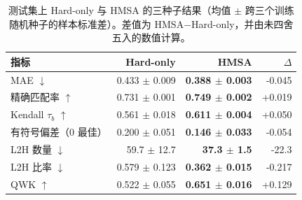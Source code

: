 \begin{table}[H]
\centering
\caption{测试集上 Hard-only 与 HMSA 的三种子结果（均值 $\pm$ 跨三个训练随机种子的样本标准差）。差值为 HMSA$-$Hard-only，并由未四舍五入的数值计算。}
\label{tab:main_results}
\small
\begin{tabular}{lrrr}
\toprule
指标 & Hard-only & HMSA & $\Delta$ \\
\midrule
MAE $\downarrow$ & 0.433 $\pm$ 0.009 & \textbf{0.388 $\pm$ 0.003} & -0.045 \\
精确匹配率 $\uparrow$ & 0.731 $\pm$ 0.001 & \textbf{0.749 $\pm$ 0.002} & +0.019 \\
Kendall $\tau_b$ $\uparrow$ & 0.561 $\pm$ 0.018 & \textbf{0.611 $\pm$ 0.004} & +0.050 \\
有符号偏差（0 最佳） & 0.200 $\pm$ 0.051 & \textbf{0.146 $\pm$ 0.033} & -0.054 \\
L2H 数量 $\downarrow$ & 59.7 $\pm$ 12.7 & \textbf{37.3 $\pm$ 1.5} & -22.3 \\
L2H 比率 $\downarrow$ & 0.579 $\pm$ 0.123 & \textbf{0.362 $\pm$ 0.015} & -0.217 \\
QWK $\uparrow$ & 0.522 $\pm$ 0.055 & \textbf{0.651 $\pm$ 0.016} & +0.129 \\
\bottomrule
\end{tabular}
\end{table}
